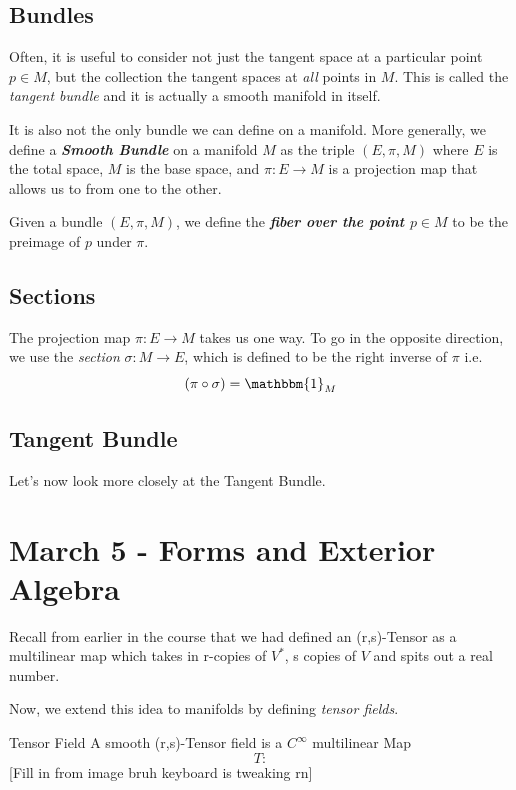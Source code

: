 \documentclass{article}
\begin{document}
\vskip 1cm
\subsection{Bundles}
Often, it is useful to consider not just the tangent space at a particular point $p \in M$, but the collection the tangent spaces at \emph{all} points in $M$. This is called the \emph{tangent bundle} and it is actually a smooth manifold in itself.

\vskip 0.5cm 
It is also not the only bundle we can define on a manifold. More generally, we define a \emph{\textbf{Smooth Bundle}} on a manifold $M$ as the triple $(E, \pi, M)$ where $E$ is the total space, $M$ is the base space, and $\pi : E \rightarrow M$ is a projection map that allows us to from one to the other.

\vskip 0.5cm
Given a bundle $(E, \pi, M)$, we define the \emph{\textbf{fiber over the point $p \in M$}} to be the preimage of $p$ under $\pi$.

\vskip 1cm
\subsection{Sections}
The projection map $\pi : E \rightarrow M$ takes us one way. To go in the opposite direction, we use the \emph{section} $\sigma : M \rightarrow E$, which is defined to be the right inverse of $\pi$ i.e.
\[  \left(\pi \circ \sigma \right) = \mathbbm{1}_M  \]


\vskip 1cm
\subsection{Tangent Bundle}

Let's now look more closely at the Tangent Bundle.


\pagebreak

\section{March 5 - Forms and Exterior Algebra}

\vskip 0.5cm
Recall from earlier in the course that we had defined an (r,s)-Tensor as a multilinear map which takes in r-copies of $V^*$, s copies of $V$ and spits out a real number.


\vskip 0.5cm
Now, we extend this idea to manifolds by defining \emph{tensor fields}.

\begin{mathdefinitionbox}{Tensor Field}
  A smooth (r,s)-Tensor field is a $C^{\infty}$ multilinear Map
  \[ T :  \]
  [Fill in from image bruh keyboard is tweaking rn]
\end{mathdefinitionbox}
\end{document}
